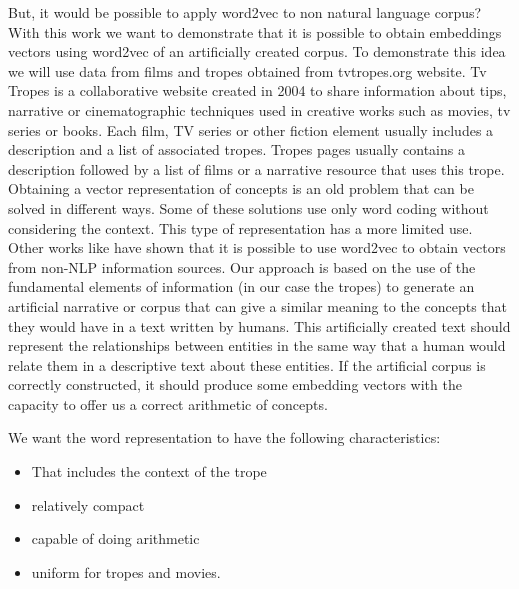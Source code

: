 \documentclass[letterpaper]{article}
\begin{document}
    But, it would be possible to apply word2vec to non natural language corpus? With this work we want to demonstrate that it is possible to obtain embeddings vectors using word2vec of an artificially created corpus. To demonstrate this idea we will use data from films and tropes obtained from tvtropes.org website. Tv Tropes is a collaborative website created in 2004 to share information about tips, narrative or cinematographic techniques used in creative works such as movies, tv series or books. Each film, TV series or other
    fiction element usually includes a description and a list of associated
    tropes. Tropes pages usually contains a description followed by a list
    of films or a narrative resource that uses this trope.\\
    
	
	Obtaining a vector representation of concepts is an old problem that can be solved in different ways. Some of these solutions use only word coding without considering the context. This type of representation has a more limited use. Other works like \cite{kazama2018} have shown that it is
	possible to use word2vec to obtain vectors from non-NLP information
	sources. Our approach is based on the use of the fundamental elements
	of information (in our case the tropes) to generate an artificial
	narrative or corpus that can give a similar meaning to the concepts
	that they would have in a text written by humans. This artificially
	created text should represent the relationships between entities in
	the same way that a human would relate them in a descriptive text
	about these entities. If the artificial corpus is correctly
	constructed, it should produce some embedding vectors with the
	capacity to offer us a correct arithmetic of concepts. 
	
	We want the word representation to have the following characteristics: 
	
	\begin{itemize}

	\item That includes the context of the trope
	\item relatively compact
	\item capable of doing arithmetic
	\item uniform for tropes and movies.
		
    \end{itemize}
	   
\end{document}
